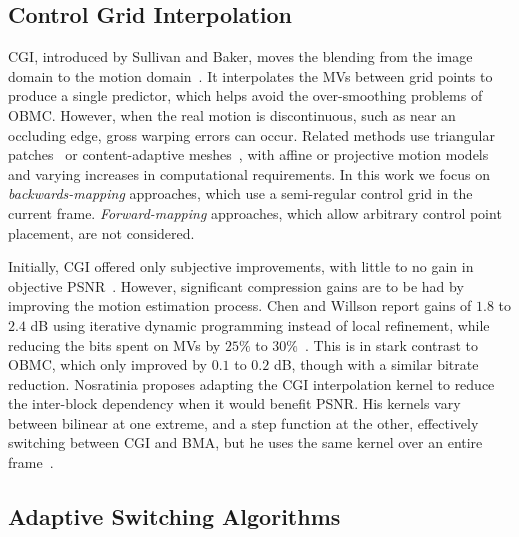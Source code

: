 \documentclass[11pt,letterpaper]{article}
\begin{document}
\subsection{Control Grid Interpolation}

CGI, introduced by Sullivan and Baker, moves the blending from the image domain
 to the motion domain~\cite{SB91}.
It interpolates the MVs between grid points to produce a single predictor,
 which helps avoid the over-smoothing problems of OBMC.
However, when the real motion is discontinuous, such as near an occluding edge,
 gross warping errors can occur.
Related methods use triangular patches~\cite{NH91} or content-adaptive
 meshes~\cite{ATB95}, with affine or projective motion models~\cite{WL96} and
 varying increases in computational requirements.
In this work we focus on \textit{backwards-mapping} approaches, which use a
 semi-regular control grid in the current frame.
\textit{Forward-mapping} approaches, which allow arbitrary control point
 placement, are not considered.

Initially, CGI offered only subjective improvements, with little to no gain in
 objective PSNR~\cite{SB91,AT98}.
However, significant compression gains are to be had by improving the motion
 estimation process.
Chen and Willson report gains of $1.8$ to $2.4$ dB using iterative dynamic
 programming instead of local refinement, while reducing the bits spent on
 MVs by $25\%$ to $30\%$~\cite{CW00}.
This is in stark contrast to OBMC, which only improved by $0.1$ to $0.2$ dB,
 though with a similar bitrate reduction.
Nosratinia proposes adapting the CGI interpolation kernel to reduce the
 inter-block dependency when it would benefit PSNR.
His kernels vary between bilinear at one extreme, and a step function at the
 other, effectively switching between CGI and BMA, but he uses the same kernel
 over an entire frame~\cite{Nos01}.

\subsection{Adaptive Switching Algorithms}
\end{document}
